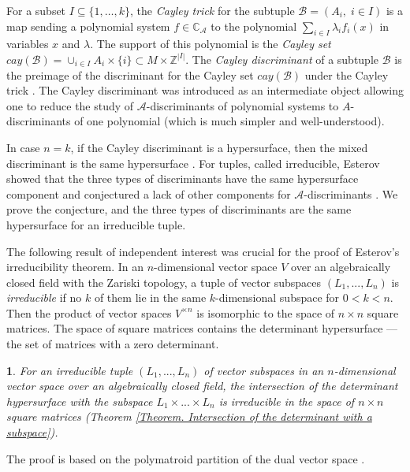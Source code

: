\documentclass[11pt]{article}
\theoremstyle{plain}
\newtheorem{thm}{\protect\theoremname}[section]
\theoremstyle{definition}
\theoremstyle{remark}
\theoremstyle{plain}
\theoremstyle{plain}
\theoremstyle{plain}
\theoremstyle{definition}
\providecommand{\theoremname}{Theorem}
\begin{document}
For a subset $I\subseteq\{1,\ldots,k\}$, the \textit{Cayley trick}
for the subtuple $\mathscr{B}=(A_{i},\;i\in I)$ is a map sending
a polynomial system $f\in\mathbb{C}_{\mathscr{A}}$ to the polynomial
$\sum_{i\in I}\lambda_{i}f_{i}(x)$ in variables $x$ and $\lambda$.
The support of this polynomial is the \textit{Cayley set} $cay(\mathscr{B})=\cup_{i\in I}A_{i}\times\{i\}\subset M\times\mathbb{Z}^{|I|}$.
The \textit{Cayley discriminant} of a subtuple $\mathscr{B}$ is the
preimage of the discriminant for the Cayley set $cay(\mathscr{B})$
under the Cayley trick \cite{esterov_newton_2010,esterov_galois_2019}. The Cayley discriminant was introduced as an intermediate object allowing one to reduce the study of $\mathscr{A}$-discriminants of polynomial
systems to $A$-discriminants of one polynomial (which is much simpler
and well-understood).

In case $n=k$, if the Cayley discriminant is a hypersurface, then
the mixed discriminant is the same hypersurface \cite{cattani_mixed_2013}.
For tuples, called irreducible, Esterov showed that the three types
of discriminants have the same hypersurface component and conjectured
a lack of other components for $\mathscr{A}$-discriminants \cite{esterov_galois_2019}.
We prove the conjecture, and the three types of discriminants are
the same hypersurface for an irreducible tuple.

The following result of independent interest was crucial for the proof
of Esterov's irreducibility theorem. In an $n$-dimensional vector
space $V$ over an algebraically closed field with the Zariski topology,
a tuple of vector subspaces $(L_{1},...,L_{n})$ is \textit{irreducible}
if no $k$ of them lie in the same $k$-dimensional subspace for $0<k<n$.
Then the product of vector spaces $V^{\times n}$ is isomorphic to
the space of $n\times n$ square matrices. The space of square matrices
contains the determinant hypersurface --- the set of matrices with
a zero determinant.
\begin{thm}
For an irreducible tuple $(L_{1},...,L_{n})$ of vector subspaces
in an $n$-dimensional vector space over an algebraically closed field,
the intersection of the determinant hypersurface with the subspace
$L_{1}\times...\times L_{n}$ is irreducible in the space of $n\times n$
square matrices \textup{(Theorem \ref{Theorem. Intersection of the determinant with a subspace})}.
\end{thm}

The proof is based on the polymatroid partition of the dual vector
space \cite{pokidkin_combinatorics_2025}. 
\end{document}
